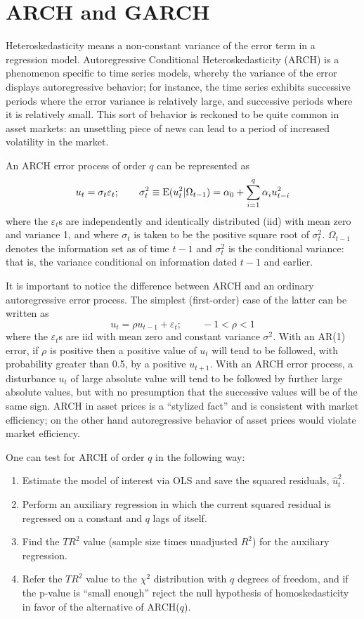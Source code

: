 \section{ARCH and GARCH}
\label{sec:arch-garch}

Heteroskedasticity means a non-constant variance of the error term in
a regression model.  Autoregressive Conditional Heteroskedasticity
(ARCH) is a phenomenon specific to time series models, whereby the
variance of the error displays autoregressive behavior; for instance,
the time series exhibits successive periods where the error variance
is relatively large, and successive periods where it is relatively
small.  This sort of behavior is reckoned to be quite common in asset
markets: an unsettling piece of news can lead to a period of increased
volatility in the market.

An ARCH error process of order $q$ can be represented as
\[
u_t = \sigma_t \varepsilon_t; \qquad
\sigma^2_t \equiv {\rm E}(u^2_t|\Omega_{t-1}) = 
\alpha_0 + \sum_{i=1}^q \alpha_i u^2_{t-i}
\]
where the $\varepsilon_t$s are independently and identically
distributed (iid) with mean zero and variance 1, and where $\sigma_t$
is taken to be the positive square root of $\sigma^2_t$.
$\Omega_{t-1}$ denotes the information set as of time $t-1$ and
$\sigma^2_t$ is the conditional variance: that is, the
variance conditional on information dated $t-1$ and earlier.

It is important to notice the difference between ARCH and an ordinary
autoregressive error process.  The simplest (first-order) case of the
latter can be written as
\[
u_t = \rho u_{t-1} + \varepsilon_t; \qquad -1 < \rho < 1
\]
where the $\varepsilon_t$s are iid with mean zero and constant
variance $\sigma^2$.  With an AR(1) error, if $\rho$ is positive then
a positive value of $u_t$ will tend to be followed, with probability
greater than 0.5, by a positive $u_{t+1}$.  With an ARCH error
process, a disturbance $u_t$ of large absolute value will tend to be
followed by further large absolute values, but with no presumption
that the successive values will be of the same sign.  ARCH in asset
prices is a ``stylized fact'' and is consistent with market
efficiency; on the other hand autoregressive behavior of asset prices
would violate market efficiency.

One can test for ARCH of order $q$ in the following
way:
\begin{enumerate}
\item Estimate the model of interest via OLS and save the squared
  residuals, $\hat{u}^2_t$.
\item Perform an auxiliary regression in which the current squared
  residual is regressed on a constant and $q$ lags of itself.
\item Find the $TR^2$ value (sample size times unadjusted $R^2$) for
  the auxiliary regression.
\item Refer the $TR^2$ value to the $\chi^2$ distribution with $q$
  degrees of freedom, and if the p-value is ``small enough'' reject
  the null hypothesis of homoskedasticity in favor of the alternative
  of ARCH($q$).
\end{enumerate}

